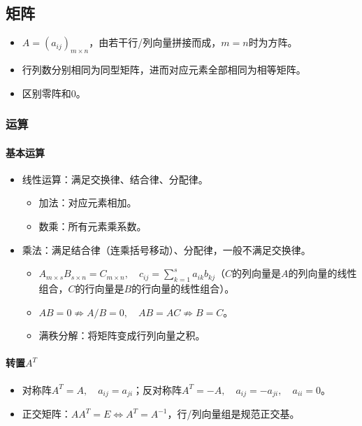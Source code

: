 \documentclass[
12pt, %
a4paper, 
oneside, %
]{scrartcl}
\begin{document}
\subsection[矩阵]{矩阵}
\begin{itemize}
\item $ A = (a_{ij})_{m \times n} $，由若干行/列向量拼接而成，$ m = n $时为方阵。
\item 行列数分别相同为同型矩阵，进而对应元素全部相同为相等矩阵。
\item 区别零阵和$ 0 $。
\end{itemize}
\subsubsection[运算]{运算}
\paragraph{基本运算}
\begin{itemize}
\item 线性运算：满足交换律、结合律、分配律。
\begin{itemize}
\item 加法：对应元素相加。
\item 数乘：所有元素乘系数。
\end{itemize}
\item 乘法：满足结合律（连乘括号移动）、分配律，一般不满足交换律。
\begin{itemize}
\item $ A_{m \times s}B_{s \times n} = C_{m \times n}, \quad c_{ij} = \sum_{k = 1}^s a_{ik} b_{kj} $（$ C $的列向量是$ A $的列向量的线性组合，$ C $的行向量是$ B $的行向量的线性组合）。
\item $ AB = 0 \not\Rightarrow A/B = 0, \quad AB = AC \not\Rightarrow B = C $。
\item 满秩分解：将矩阵变成行列向量之积。
\end{itemize}
\end{itemize}
\paragraph{转置$ A^T $}
\begin{itemize}
\item 对称阵$ A^T = A, \quad a_{ij} = a_{ji} $；反对称阵$ A^T = -A, \quad a_{ij} = -a_{ji}, \quad a_{ii} = 0 $。
\item 正交矩阵：$ A A^T = E \Leftrightarrow A^T = A^{-1} $，行/列向量组是规范正交基。
\end{itemize}
\end{document}
